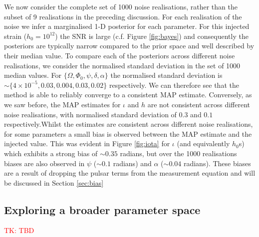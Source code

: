 \documentclass[fleqn,usenatbib,useAMS]{mnras}
\begin{document}
We now consider the complete set of 1000 noise realisations, rather than the subset of 9 realisations in the preceding discussion. For each realisation of the noise we infer a marginalised 1-D posterior for each parameter. For this injected strain ($h_0 = 10^{12}$) the SNR is large (c.f. Figure \ref{fig:bayes}) and consequently the posteriors are typically narrow compared to the prior space and well described by their median value. To compare each of the posteriors across different noise realisations, we consider the normalised standard deviation in the set of 1000 median values. For $\{\Omega, \Phi_0, \psi, \delta, \alpha \}$ the normalised standard deviation is $\sim \{4 \times 10^{-5}, 0.03,0.004,0.03,0.02 \}$ respectively. We can therefore see that the method is able to reliably converge to a consistent MAP estimate. Conversely, as we saw before, the MAP estimates for $\iota$ and $h$ are not consistent across different noise realisations, with normalised standard deviation of $0.3$ and $0.1$ respectively.Whilst the estimates are consistent across different noise realisations, for some parameters a small bias is observed between the MAP estimate and the injected value. This was evident in Figure \ref{fig:iota} for $\iota$ (and equivalently $h_0$s) which exhibits a strong bias of $\sim 0.35$ radians, but over the 1000 realisations biases are also observed in $\psi$ ($\sim 0.1$ radians) and $\alpha$ ($\sim 0.04$ radians). These biases are a result of dropping the pulsar terms from the measurement equation and will be discussed in Section \ref{sec:bias}


\subsection{Exploring a broader parameter space} \label{sec:parameter_space}

\textcolor{red}{TK: TBD}
\end{document}
